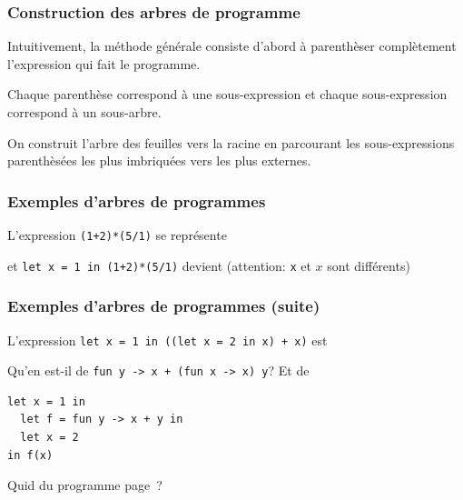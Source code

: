 %
\begin{frame}
\frametitle{Construction des arbres de programme}

Intuitivement, la méthode générale consiste d'abord à parenthèser
complètement l'expression qui fait le programme.

\bigskip

\noindent Chaque parenthèse correspond à une sous-expression et chaque
sous-expression correspond à un sous-arbre.

\bigskip

On construit l'arbre des feuilles vers la racine en parcourant les
sous-expressions parenthèsées les plus imbriquées vers les plus
externes.

\end{frame}

%
\begin{frame}[containsverbatim]
\frametitle{Exemples d'arbres de programmes}

L'expression \verb|(1+2)*(5/1)| se représente
    {\small
    \begin{center}
    \end{center}
    }
et \verb|let x = 1 in (1+2)*(5/1)| devient (attention: \verb+x+ et $x$
sont différents)
    {\small
    \begin{center}
    \end{center}
    }

\end{frame}

%
\begin{frame}[containsverbatim]
\frametitle{Exemples d'arbres de programmes (suite)}
\label{exemples_arbres_suite}

L'expression \verb|let x = 1 in ((let x = 2 in x) + x)| est
{\small
\begin{center}
\end{center}
}
Qu'en est-il de \verb|fun y -> x + (fun x -> x) y|? Et de
{\small
\begin{verbatim}
let x = 1 in
  let f = fun y -> x + y in
  let x = 2
in f(x)
\end{verbatim}
}
Quid du programme page~\pageref{un_autre_programme}?

\end{frame}

